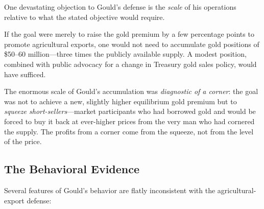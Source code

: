 \documentclass[12pt]{article}
\begin{document}
One devastating objection to Gould's defense is the \emph{scale} of 
his operations relative to what the stated objective would require.

If the goal were merely to raise the gold premium by a few percentage 
points to promote agricultural exports, one would not need to accumulate 
gold positions of \$50--60 million---three times the publicly available 
supply. A modest position, combined with public advocacy for a change in 
Treasury gold sales policy, would have sufficed.

The enormous scale of Gould's accumulation was \emph{diagnostic of a 
corner}: the goal was not to achieve a new, slightly higher equilibrium 
gold premium but to \emph{squeeze short-sellers}---market participants 
who had borrowed gold and would be forced to buy it back at ever-higher 
prices from the very man who had cornered the supply. The profits from 
a corner come from the squeeze, not from the level of the price.

\subsection{The Behavioral Evidence}

Several features of Gould's behavior are flatly inconsistent with the 
agricultural-export defense:
\end{document}
